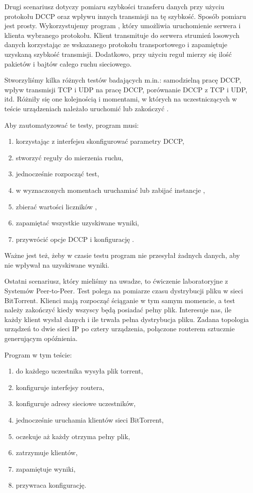 \documentclass[00-praca-magisterska.tex]{subfiles}
\begin{document}
Drugi scenariusz dotyczy pomiaru szybkości transferu danych przy użyciu
protokołu DCCP oraz wpływu innych transmisji na tę szybkość. Sposób pomiaru
jest prosty. Wykorzystujemy program , który umożliwia uruchomienie
serwera i klienta wybranego protokołu. Klient transmituje do serwera strumień
losowych danych korzystając ze wskazanego protokołu transportowego i zapamiętuje
uzyskaną szybkość transmisji. Dodatkowo, przy użyciu reguł 
mierzy się ilość pakietów i bajtów całego ruchu sieciowego.

Stworzyliśmy kilka różnych testów badających m.in.: samodzielną pracę DCCP,
wpływ transmisji TCP i UDP na pracę DCCP, porównanie DCCP z TCP i UDP, itd.
Różniły się one kolejnością i momentami, w których na uczestniczących w teście
urządzeniach należało uruchomić lub zakończyć .

Aby zautomatyzować te testy, program musi:
\begin{enumerate}
\item korzystając z interfejsu  skonfigurować parametry DCCP,
\item stworzyć reguły  do mierzenia ruchu,
\item jednocześnie rozpocząć test,
\item w wyznaczonych momentach uruchamiać lub zabijać instancje ,
\item zbierać wartości liczników ,
\item zapamiętać wszystkie uzyskiwane wyniki,
\item przywrócić opcje DCCP i konfigurację .
\end{enumerate}

Ważne jest też, żeby w czasie testu program nie przesyłał żadnych danych, aby
nie wpływał na uzyskiwane wyniki.

Ostatni scenariusz, który mieliśmy na uwadze, to ćwiczenie laboratoryjne z
Systemów Peer-to-Peer. Test polega na pomiarze czasu dystrybucji pliku w sieci
BitTorrent. Klienci mają rozpocząć ściąganie w tym samym momencie, a test należy
zakończyć kiedy wszyscy będą posiadać pełny plik. Interesuje nas, ile każdy
klient wysłał danych i ile trwała pełna dystrybucja pliku. Zadana topologia
urządzeń to dwie sieci IP po cztery urządzenia, połączone routerem sztucznie
generującym opóźnienia.

Program w tym teście:
\begin{enumerate}
\item do każdego uczestnika wysyła plik torrent,
\item konfiguruje interfejsy routera,
\item konfiguruje adresy sieciowe uczestników,
\item jednocześnie uruchamia klientów sieci BitTorrent,
\item oczekuje aż każdy otrzyma pełny plik,
\item zatrzymuje klientów,
\item zapamiętuje wyniki,
\item przywraca konfigurację.
\end{enumerate}
\end{document}
